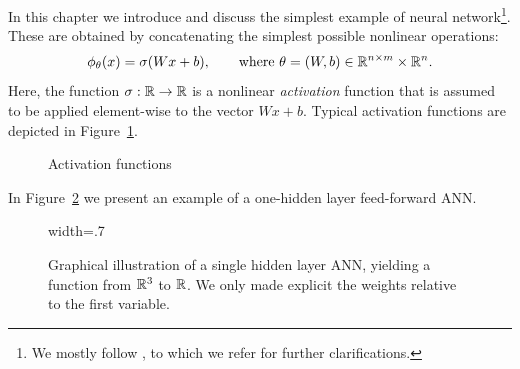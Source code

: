 In this chapter we introduce and discuss the simplest example of neural network\footnote{We mostly follow \cite{petersenMathematical2025}, to which we refer for further clarifications.}.
These are obtained by concatenating the simplest possible nonlinear operations:
\begin{equation}
    \phi_\theta(x) = \sigma(Wx + b), \qquad \text{where } \theta=(W,b) \in \mathbb{R}^{n\times m}\times \mathbb{R}^n.
\end{equation}
Here, the function $\sigma:\mathbb{R}\to \mathbb{R}$ is a nonlinear \emph{activation} function that is assumed to be applied element-wise to the vector $Wx+b$.
Typical activation functions are depicted in Figure~\ref{fig:activations}.

\begin{figure}[b]
    \centering
    
    \caption{Activation functions}
    \label{fig:activations}
\end{figure}


In Figure~\ref{fig:one-hidden-layer} we present an example of a one-hidden layer feed-forward ANN.

\def\layersep{4cm}
\begin{figure}[t]
    \centering
    \begin{adjustbox}{width=.7\textwidth}
        
    \end{adjustbox}
    \caption{\label{fig:one-hidden-layer}Graphical illustration of a single hidden layer ANN, yielding a function from $\mathbb{R}^3$ to $\mathbb{R}$. We only made explicit the weights relative to the first variable.}
\end{figure}

